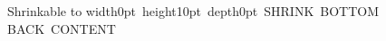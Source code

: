\documentclass{pnpcards}
\begin{document}
\begin{card}{Shrinkable}
\offinterlineskip
\vbox to \dimexpr\pnpcards@frontbodyheight-10pt
\hbox{\vrule width0pt height10pt depth0pt SHRINK BOTTOM}
\vskip0pt
\hbox{BACK CONTENT}
\end{card}
\end{document}
